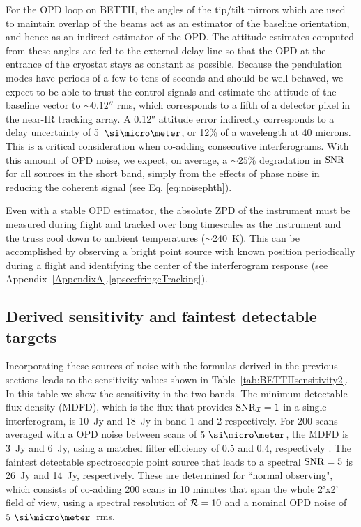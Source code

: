 For the OPD loop on BETTII, the angles of the tip/tilt mirrors which are used to maintain overlap of the beams act as an estimator of the baseline orientation, and hence as an indirect estimator of the OPD. The attitude estimates computed from these angles are fed to the external delay line so that the OPD at the entrance of the cryostat stays as constant as possible. Because the pendulation modes have periods of a few to tens
of seconds and should be well-behaved, we expect to be able to trust the control signals and estimate the attitude of the baseline vector to $\sim \ang{;;0.12}$ rms, which corresponds to a fifth of a detector pixel in the near-IR tracking array. A \ang{;;0.12} attitude error indirectly corresponds to a delay uncertainty of 5~$\um$, or 12\% of a wavelength at 40 microns. This is a critical consideration when co-adding consecutive interferograms. With this amount of OPD noise, we expect, on average, a $\sim 25\%$ degradation in $\textrm{SNR}$ for all sources in the short band, simply from the effects of phase noise in reducing the coherent signal (see Eq. \ref{eq:noisephth}).

Even with a stable OPD estimator, the absolute ZPD of the instrument must be measured during flight and tracked over long timescales as the instrument and the truss cool down to ambient temperatures ($\sim$240~K). This can be accomplished by observing a bright point source with known position periodically during a flight and identifying the center of the interferogram response (see Appendix~\ref{AppendixA}.\ref{apsec:fringeTracking}).

\subsection{Derived sensitivity and faintest detectable targets}

Incorporating these sources of noise with the formulas derived in the previous sections leads to the sensitivity values shown in Table~\ref{tab:BETTIIsensitivity2}. In this table we show the sensitivity in the two bands. The minimum detectable flux density (MDFD), which is the flux that provides $\textrm{SNR}_{\mathcal{I}} = 1$ in a single interferogram, is 10~Jy and 18~Jy in band 1 and 2 respectively. For 200 scans averaged with a OPD noise between scans of $5~\um$, the MDFD is 3~Jy and 6~Jy, using a matched filter efficiency of 0.5 and 0.4, respectively \citep{Mighell:2005fwa}. The faintest detectable spectroscopic point source that leads to a spectral $\textrm{SNR}=5$ is 26~Jy and 14~Jy, respectively. These are determined for ``normal observing", which consists of co-adding 200 scans in 10 minutes that span the whole 2'x2' field of view, using a spectral resolution of $\mathcal{R}=10$ and a nominal OPD noise of $5~\um$~rms. 

